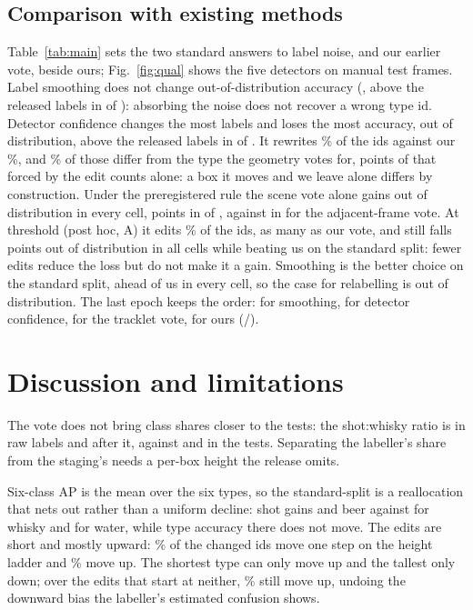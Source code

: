 \documentclass{article}
\begin{document}
\subsection{Comparison with existing methods}
\label{sec:pairs}
Table~\ref{tab:main} sets the two standard answers to label noise, and our earlier vote, beside ours; Fig.~\ref{fig:qual} shows the five detectors on manual test frames. Label smoothing does not change out-of-distribution accuracy (\BaseLsOODGain, above the released labels in \BaseLsOODPos{} of \SvCells): absorbing the noise does not recover a wrong type id. Detector confidence changes the most labels and loses the most accuracy, \BaseCfOODGain{} out of distribution, above the released labels in \BaseCfOODPos{} of \SvCells. It rewrites \ConfidChangedPct\% of the ids against our \SceneChangedRosterPct\%, and \ConfidVsSceneDisagreePct\% of those differ from the type the geometry votes for, \ConfidFloorPct{} points of that forced by the edit counts alone: a box it moves and we leave alone differs by construction. Under the preregistered rule the scene vote alone gains out of distribution in every cell, \BaseSvOODGain{} points in \BaseSvOODPos{} of \SvCells, against \BaseTrkOODGain{} in \BaseTrkOODPos{} for the adjacent-frame vote. At threshold \ConfidTauHigh{} (post hoc, A) it edits \ConfidTauHighChangedPct\% of the ids, as many as our vote, and still falls \ConfidTauHighOODDrop{} points out of distribution in all \ConfidTauHighCells{} cells while beating us on the standard split: fewer edits reduce the loss but do not make it a gain. Smoothing is the better choice on the standard split, ahead of us in every cell, so the case for relabelling is out of distribution. The last epoch keeps the order: \LastLsOODGain{} for smoothing, \LastCfOODGain{} for detector confidence, \TrkLSixOODVsRawGainL{} for the tracklet vote, \LastSvOODGain{} for ours (\LastSvOODPos{}/\SvCells).

\section{Discussion and limitations}
\label{sec:limits}
The vote does not bring class shares closer to the tests: the shot:whisky ratio is \RatioRawTrain{} in raw labels and \RatioSceneTrain{} after it, against \RatioManualStd{} and \RatioManualOOD{} in the tests. Separating the labeller's share from the staging's needs a per-box height the release omits.

Six-class AP is the mean over the six types, so the standard-split \SvSixStdVsRawGain{} is a reallocation that nets out rather than a uniform decline: shot gains \ClsStdShot{} and beer \ClsStdBeer{} against \ClsStdWhisky{} for whisky and \ClsStdWater{} for water, while type accuracy there does not move. The edits are short and mostly upward: \VoteOneStepPct\% of the \VoteChangedBoxes{} changed ids move one step on the height ladder and \VoteUpPct\% move up. The shortest type can only move up and the tallest only down; over the \VoteInnerEdits{} edits that start at neither, \VoteInnerUpPct\% still move up, undoing the downward bias the labeller's estimated confusion shows.
\end{document}
